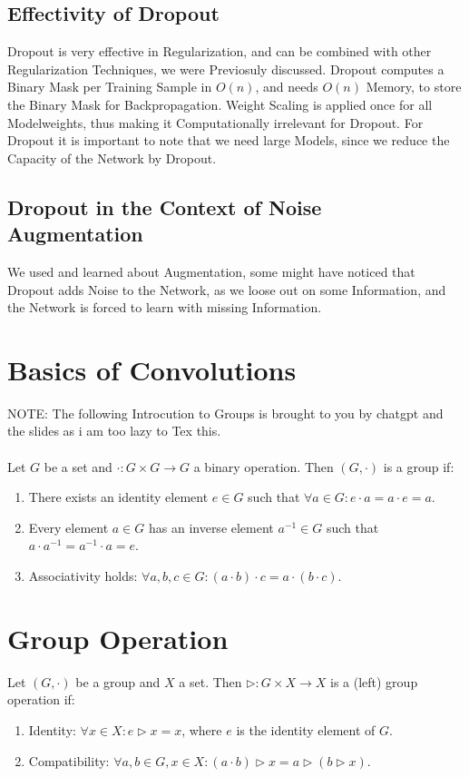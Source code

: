 \documentclass[a4paper]{article}
\begin{document}
\subsection{Effectivity of Dropout}
Dropout is very effective in Regularization, and can be combined with other Regularization Techniques, we were Previosuly discussed. Dropout computes a Binary Mask per Training Sample in $O(n)$, and needs $O(n)$ Memory, to store the Binary Mask for Backpropagation. Weight Scaling is applied once for all Modelweights, thus making it Computationally irrelevant for Dropout. 
For Dropout it is important to note that we need large Models, since we reduce the Capacity of the Network by Dropout.

\subsection{Dropout in the Context of Noise Augmentation}
We used and learned about Augmentation, some might have noticed that Dropout adds Noise to the Network, as we loose out on some Information, and the Network is forced to learn with missing Information. 

\section{Basics of Convolutions}
NOTE: The following Introcution to Groups is brought to you by chatgpt and the slides as i am too lazy to Tex this. \\\\
Let \( G \) be a set and \( \cdot : G \times G \rightarrow G \) a binary operation. Then \((G, \cdot)\) is a group if:
\begin{enumerate}
    \item There exists an identity element \( e \in G \) such that \(\forall a \in G: e \cdot a = a \cdot e = a \).
    \item Every element \( a \in G \) has an inverse element \( a^{-1} \in G \) such that \( a \cdot a^{-1} = a^{-1} \cdot a = e \).
    \item Associativity holds: \(\forall a, b, c \in G : (a \cdot b) \cdot c = a \cdot (b \cdot c)\).
\end{enumerate}

\section*{Group Operation}

Let \((G, \cdot)\) be a group and \( X \) a set. Then \( \triangleright : G \times X \rightarrow X \) is a (left) group operation if:
\begin{enumerate}
    \item Identity: \(\forall x \in X : e \triangleright x = x\), where \( e \) is the identity element of \( G \).
    \item Compatibility: \(\forall a, b \in G, x \in X : (a \cdot b) \triangleright x = a \triangleright (b \triangleright x)\).
\end{enumerate}
\end{document}
